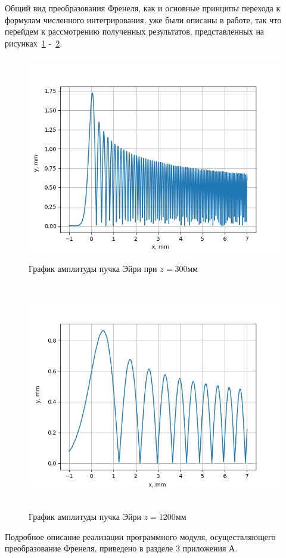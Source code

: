 {    Общий вид преобразования Френеля, как и основные принципы перехода к формулам численного интегрирования,
    уже были описаны в работе, так что перейдем к рассмотрению полученных результатов,
    представленных на рисунках~\ref{fres300} -~\ref{fres1200}.

    \begin{figure}[H]
        \centering
        \includegraphics[height = 9cm]{plots/fres300.png}
        \caption{График амплитуды пучка Эйри при $z = 300$мм}
        \label{fres300}
    \end{figure}

    \begin{figure}[H]
        \centering
        \includegraphics[height = 10cm]{plots/fres1200.png}
        \caption{График амплитуды пучка Эйри $z = 1200$мм}
        \label{fres1200}
    \end{figure}
    \vspace{0.5cm}
    Подробное описание реализации программного модуля, осуществляющего преобразование Френеля, приведено в разделе 3 приложения А.

    }\label{sec:nohyphens2}

